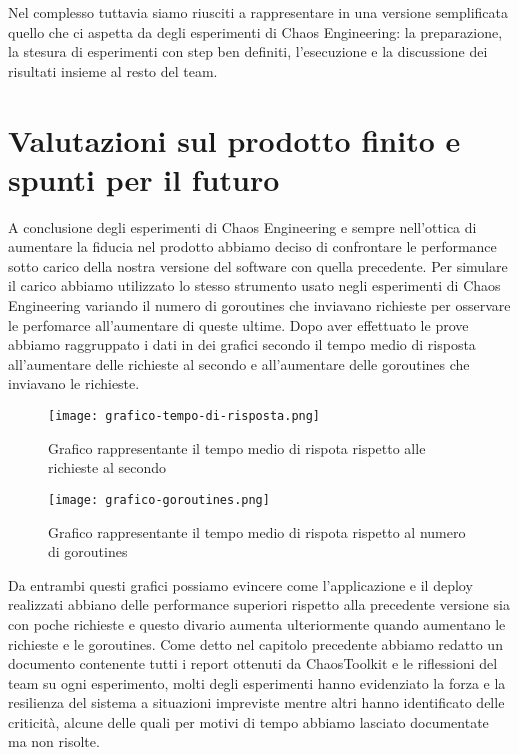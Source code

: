 Nel complesso tuttavia siamo riusciti a rappresentare in una versione semplificata quello che ci aspetta da degli esperimenti di Chaos Engineering: la preparazione, la stesura di esperimenti con step ben definiti, l'esecuzione e la discussione dei risultati insieme al resto del team.

\section{Valutazioni sul prodotto finito e spunti per il futuro}
A conclusione degli esperimenti di Chaos Engineering e sempre nell'ottica di aumentare la fiducia nel prodotto abbiamo deciso di confrontare le performance sotto carico della nostra versione del software con quella precedente.
Per simulare il carico abbiamo utilizzato lo stesso strumento usato negli esperimenti di Chaos Engineering variando il numero di goroutines che inviavano richieste per osservare le perfomarce all'aumentare di queste ultime.
Dopo aver effettuato le prove abbiamo raggruppato i dati in dei grafici secondo il tempo medio di risposta all'aumentare delle richieste al secondo e all'aumentare delle goroutines che inviavano le richieste.
\begin{figure}[h]
    \centering
    \texttt{[image: grafico-tempo-di-risposta.png]}
    \caption{Grafico rappresentante il tempo medio di rispota rispetto alle richieste al secondo}
    \label{tab:graph-req-sec}
\end{figure}
\begin{figure}[h]
    \centering
    \texttt{[image: grafico-goroutines.png]}
    \caption{Grafico rappresentante il tempo medio di rispota rispetto al numero di goroutines}
    \label{tab:graph-goroutines}
\end{figure}

Da entrambi questi grafici possiamo evincere come l'applicazione e il deploy realizzati abbiano delle performance superiori rispetto alla precedente versione sia con poche richieste e questo divario aumenta ulteriormente quando aumentano le richieste e le goroutines.
Come detto nel capitolo precedente abbiamo redatto un documento contenente tutti i report ottenuti da ChaosToolkit e le riflessioni del team su ogni esperimento, molti degli esperimenti hanno evidenziato la forza e la resilienza del sistema a situazioni impreviste mentre altri hanno identificato delle criticità, alcune delle quali per motivi di tempo abbiamo lasciato documentate ma non risolte.